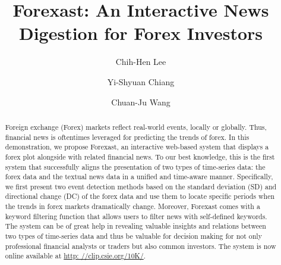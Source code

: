 \documentclass[sigconf]{acmart}
\begin{document}
\title{Forexast: An Interactive News Digestion for Forex Investors}


\author{Chih-Hen Lee}

\author{Yi-Shyuan Chiang}

\author{Chuan-Ju Wang}


\renewcommand{\shortauthors}{Trovato and Tobin, et al.}

\begin{abstract}
Foreign exchange (Forex) markets reflect real-world events, locally or globally.
Thus,  financial news is oftentimes leveraged for predicting the trends of forex.
In this demonstration, we propose Forexast, an interactive web-based system that displays a forex plot alongside with related financial news.
To our best knowledge, this is the first system that successfully aligns the presentation of two types of time-series data: the forex data and the textual news data in a unified and time-aware manner. 
Specifically, we first present two event detection methods based on the standard deviation (SD) and directional change (DC) of the forex data and use them to locate specific periods when the trends in forex markets dramatically change.
Moreover, Forexast comes with a keyword filtering function that allows users to filter news with self-defined keywords.
The system can be of great help in revealing valuable insights and relations between two types of time-series data and thus be valuable for decision making for not only professional financial analysts or traders but also common investors.
The system is now online available at \url{http: //clip.csie.org/10K/}.
\end{abstract}
\end{document}
